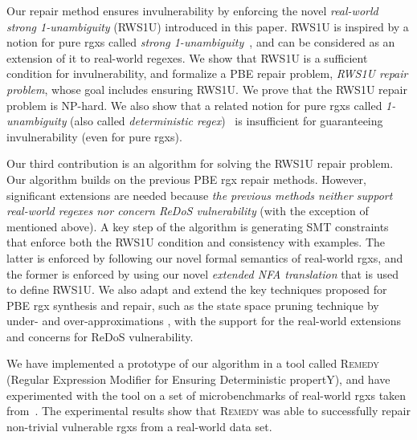 \documentclass[conference]{IEEEtran}
\newcommand{\tool}{\textsc{Remedy}}
\newcommand{\ltp}{RWS1U}
\begin{document}
Our repair method ensures invulnerability by enforcing the novel {\em real-world strong 1-unambiguity} (\ltp{}) introduced in this paper.  \ltp{} is inspired by a notion for pure {rgxs} called {\em strong 1-unambiguity}~\cite{10.1007/s00778-005-0169-1}, and can be considered as an extension of it to real-world regexes.  We show that \ltp{} is a sufficient condition for invulnerability, and formalize a PBE repair problem, {\em \ltp{} repair problem}, whose goal includes ensuring \ltp{}.  We prove that the \ltp{} repair problem is NP-hard.  We also show that a related notion for pure {rgxs} called {\em 1-unambiguity} (also called {\em deterministic regex})~\cite{BRUGGEMANNKLEIN1998182,FlashRegex,10.1007/3-540-57273-2_45} is insufficient for guaranteeing invulnerability (even for pure {rgxs}). 

Our third contribution is an algorithm for solving the \ltp{} repair problem.  Our algorithm builds on the previous PBE {rgx} repair methods.  However, significant extensions are needed because {\em the previous methods neither support real-world regexes nor concern ReDoS vulnerability} (with the exception of \cite{FlashRegex} mentioned above).  A key step of the algorithm is generating SMT constraints that enforce both the \ltp{} condition and consistency with examples.  The latter is enforced by following our novel formal semantics of real-world {rgxs}, and the former is enforced by using our novel {\em extended NFA translation} that is used to define \ltp{}.
We also adapt and extend the key techniques proposed for PBE {rgx} synthesis and repair, such as the state space pruning technique by under- and over-approximations \cite{10.1145/3093335.2993244, 10.1145/3360565}, with the support for the real-world extensions and concerns for ReDoS vulnerability.



We have implemented a prototype of our algorithm in a tool called \tool{} (Regular Expression Modifier for Ensuring Deterministic propertY), and have experimented with the tool on a set of microbenchmarks of real-world {rgxs} taken from~\cite{Davis:2018:IRE:3236024.3236027}.  The experimental results show that \tool{} was able to successfully repair non-trivial vulnerable {rgxs} from a real-world data set. 
\end{document}
